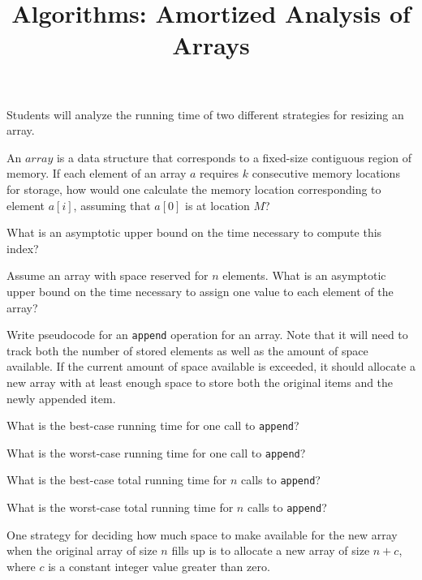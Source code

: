 \documentclass{tufte-handout}
\title{Algorithms: Amortized Analysis of Arrays}
\date{}
\begin{document}
\maketitle



\begin{objective}
  Students will analyze the running time of two different strategies for resizing an array.
\end{objective}


\begin{questions}

\item An $array$ is a data structure that corresponds to a fixed-size contiguous region of memory. If each element of an array $a$ requires $k$ consecutive memory locations for storage, how would one calculate the memory location corresponding to element $a[i]$, assuming that $a[0]$ is at location $M$?

\item What is an asymptotic upper bound on the time necessary to compute this index? \label{asymptoticlookup}

\item Assume an array with space reserved for $n$ elements. What is an asymptotic upper bound on the time necessary to assign one value to each element of the array?

\item Write pseudocode for an \verb|append| operation for an array. Note that it will need to track both the number of stored elements as well as the amount of space available. If the current amount of space available is exceeded, it should allocate a new array with at least enough space to store both the original items and the newly appended item.

\item What is the best-case running time for one call to \verb|append|?

\item What is the worst-case running time for one call to \verb|append|?

\item What is the best-case total running time for $n$ calls to \verb|append|?

\item What is the worst-case total running time for $n$ calls to \verb|append|?

\item One strategy for deciding how much space to make available for the new array when the original array of size $n$ fills up is to allocate a new array of size $n + c$, where $c$ is a constant integer value greater than zero.


\end{questions}
\end{document}
